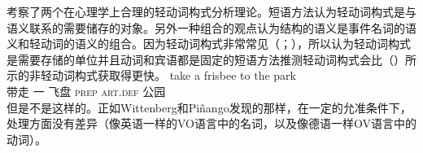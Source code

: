 \begin{exe}
\begin{xlist}[iv.]
\begin{exe}
\begin{xlist}[iv.]
 \citet{WP2011a}考察了两个在心理学上合理的轻动词构式分析理论。短语方法认为轻动词构式是与语义联系的需要储存的对象\citep{Goldberg2003a}。另外一种组合的观点认为结构的语义是事件名词的语义和轻动词的语义的组合\citep{Grimshaw97a-u,Butt2003a-u,Jackendoff2002a-u,CJ2005a,MuellerPersian,BPW2008a-u}。因为轻动词构式非常常见（\citealp*{Pinango:2006qy}；\citealp[]{WP2011a}），所以认为轻动词构式是需要存储的单位并且动词和宾语都是固定的短语方法推测轻动词构式会比（）所示的非轻动词构式获取得更快\citep[]{WP2011a}。
\ea
\gll take a frisbee to the park\\
     带走 一 飞盘 \textsc{prep} \textsc{art}.\textsc{def} 公园\\
\z
但是不是这样的。正如Wittenberg和Piñango发现的那样，在一定的允准条件下，处理方面没有差异（像英语一样的VO语言中的名词，以及像德语一样OV语言中的动词）。


\end{xlist}
\end{exe}
\end{xlist}
\end{exe}
